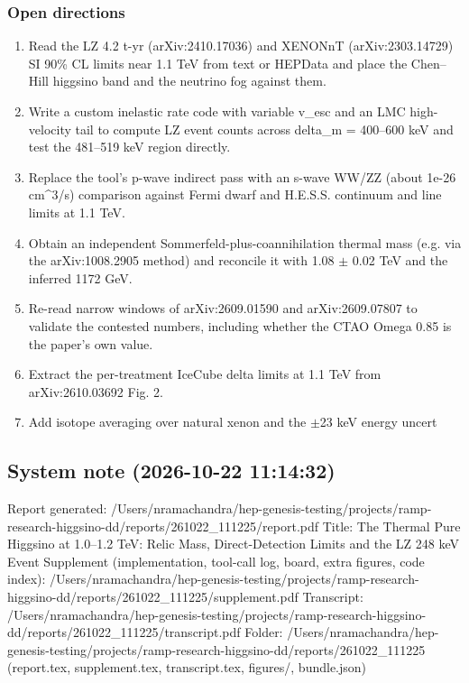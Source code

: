 \documentclass[11pt,a4paper]{article}
\begin{document}
\subsubsection*{Open directions}
\begin{enumerate}
  \item Read the LZ 4.2 t-yr (arXiv:2410.17036) and XENONnT (arXiv:2303.14729) SI 90\% CL limits near 1.1 TeV from text or HEPData and place the Chen--Hill higgsino band and the neutrino fog against them.
  \item Write a custom inelastic rate code with variable v\_esc and an LMC high-velocity tail to compute LZ event counts across delta\_m = 400--600 keV and test the 481--519 keV region directly.
  \item Replace the tool's p-wave indirect pass with an s-wave WW/ZZ (about 1e-26 cm\textasciicircum{}3/s) comparison against Fermi dwarf and H.E.S.S. continuum and line limits at 1.1 TeV.
  \item Obtain an independent Sommerfeld-plus-coannihilation thermal mass (e.g. via the arXiv:1008.2905 method) and reconcile it with 1.08 $\pm$ 0.02 TeV and the inferred 1172 GeV.
  \item Re-read narrow windows of arXiv:2609.01590 and arXiv:2609.07807 to validate the contested numbers, including whether the CTAO Omega 0.85 is the paper's own value.
  \item Extract the per-treatment IceCube delta limits at 1.1 TeV from arXiv:2610.03692 Fig. 2.
  \item Add isotope averaging over natural xenon and the $\pm$23 keV energy uncert
\end{enumerate}
\subsection*{System note \small(2026-10-22 11:14:32)}
Report generated: /Users/nramachandra/hep-genesis-testing/projects/ramp-research-higgsino-dd/reports/261022\_111225/report.pdf Title: The Thermal Pure Higgsino at 1.0--1.2 TeV: Relic Mass, Direct-Detection Limits and the LZ 248 keV Event Supplement (implementation, tool-call log, board, extra figures, code index): /Users/nramachandra/hep-genesis-testing/projects/ramp-research-higgsino-dd/reports/261022\_111225/supplement.pdf Transcript: /Users/nramachandra/hep-genesis-testing/projects/ramp-research-higgsino-dd/reports/261022\_111225/transcript.pdf Folder: /Users/nramachandra/hep-genesis-testing/projects/ramp-research-higgsino-dd/reports/261022\_111225 (report.tex, supplement.tex, transcript.tex, figures/, bundle.json)
\end{document}
